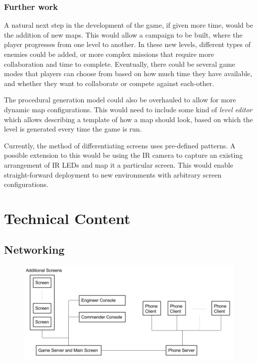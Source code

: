 \documentclass[a4paper,11pt]{article}
\begin{document}
\subsubsection{Further work}

A natural next step in the development of the game, if given more time, would be the addition of new maps. This would allow a campaign to be built, where the player progresses from one level to another. In these new levels, different types of enemies could be added, or more complex missions that require more collaboration and time to complete. Eventually, there could be several game modes that players can choose from based on how much time they have available, and whether they want to collaborate or compete against each-other.

The procedural generation model could also be overhauled to allow for more dynamic map configurations. This would need to include some kind of \emph{level editor} which allows describing a template of how a map should look, based on which the level is generated every time the game is run.

Currently, the method of differentiating screens uses pre-defined patterns. A possible extension to this would be using the IR camera to capture an existing arrangement of IR LEDs and map it a particular screen. This would enable straight-forward deployment to new environments with arbitrary screen configurations.

\section{Technical Content}
\subsection{Networking}

\begin{figure}[ht]
	\centering
	\includegraphics[width=\textwidth]{images/network_diagram}
    \label{fig:network_diagram}
\end{figure}
\end{document}
